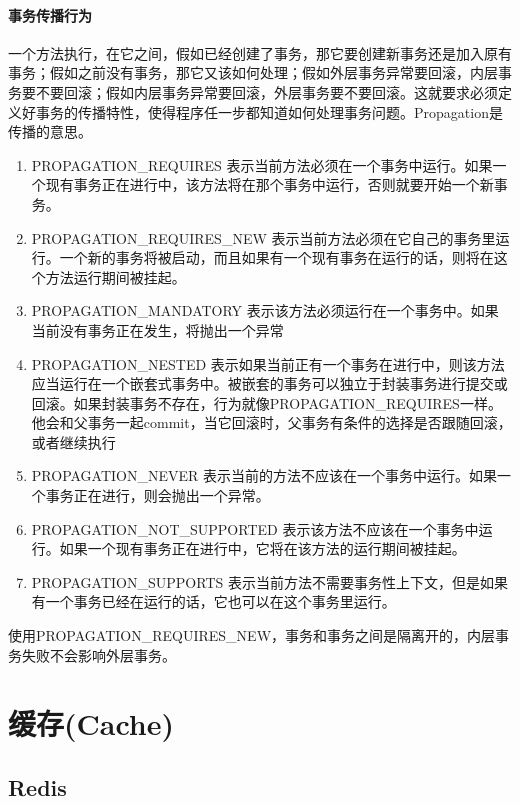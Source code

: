 \documentclass[../../../interview-questions.tex]{subfiles}
\begin{document}
\paragraph{事务传播行为}

一个方法执行，在它之间，假如已经创建了事务，那它要创建新事务还是加入原有事务；假如之前没有事务，那它又该如何处理；假如外层事务异常要回滚，内层事务要不要回滚；假如内层事务异常要回滚，外层事务要不要回滚。这就要求必须定义好事务的传播特性，使得程序任一步都知道如何处理事务问题。Propagation是传播的意思。

\begin{enumerate}
\item {PROPAGATION\_REQUIRES	表示当前方法必须在一个事务中运行。如果一个现有事务正在进行中，该方法将在那个事务中运行，否则就要开始一个新事务。}
\item{PROPAGATION\_REQUIRES\_NEW	表示当前方法必须在它自己的事务里运行。一个新的事务将被启动，而且如果有一个现有事务在运行的话，则将在这个方法运行期间被挂起。}
\item{PROPAGATION\_MANDATORY	表示该方法必须运行在一个事务中。如果当前没有事务正在发生，将抛出一个异常}
\item{PROPAGATION\_NESTED	表示如果当前正有一个事务在进行中，则该方法应当运行在一个嵌套式事务中。被嵌套的事务可以独立于封装事务进行提交或回滚。如果封装事务不存在，行为就像PROPAGATION\_REQUIRES一样。他会和父事务一起commit，当它回滚时，父事务有条件的选择是否跟随回滚，或者继续执行}
\item{PROPAGATION\_NEVER	表示当前的方法不应该在一个事务中运行。如果一个事务正在进行，则会抛出一个异常。}
\item{PROPAGATION\_NOT\_SUPPORTED	表示该方法不应该在一个事务中运行。如果一个现有事务正在进行中，它将在该方法的运行期间被挂起。}
\item{PROPAGATION\_SUPPORTS	表示当前方法不需要事务性上下文，但是如果有一个事务已经在运行的话，它也可以在这个事务里运行。}
\end{enumerate}


使用PROPAGATION\_REQUIRES\_NEW，事务和事务之间是隔离开的，内层事务失败不会影响外层事务。


\section{缓存(Cache)}

\subsection{Redis}
\end{document}
